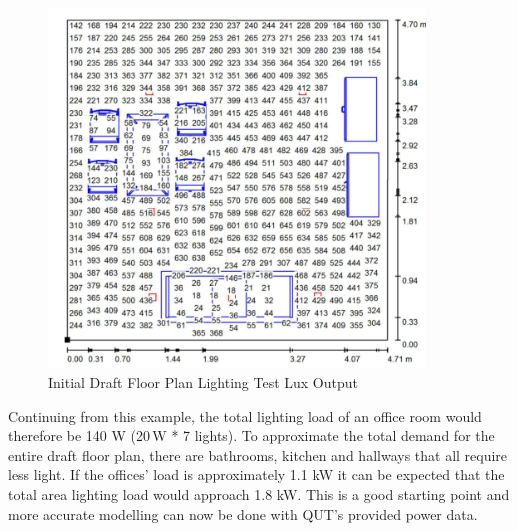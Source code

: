 \begin{figure}[H]
\hfill\includegraphics[width = 100mm]{images/lighting_draft_output}\hspace*{\fill}
\caption{Initial Draft Floor Plan Lighting Test Lux Output} 
\label{fig:DraftLightingLux}
\end{figure} 

Continuing from this example, the total lighting load of an office room would therefore be 140 W (20\,W * 7 lights). To approximate the total demand for the entire draft floor plan, there are bathrooms, kitchen and hallways that all require less light. If the offices' load is approximately 1.1 kW it can be expected that the total area lighting load would approach 1.8 kW. This is a good starting point and more accurate modelling can now be done with QUT's provided power data. 